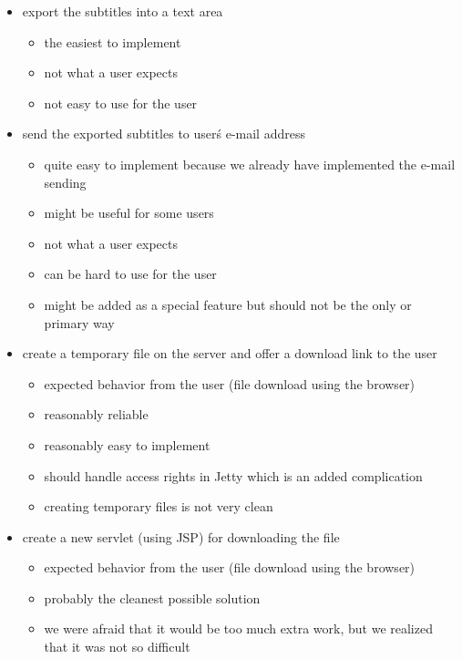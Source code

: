 {\begin{itemize}

\item export the subtitles into a text area
\begin{itemize}
\item the easiest to implement
\item not what a user expects
\item not easy to use for the user
\end{itemize}

\item send the exported subtitles to user\'s e-mail address
\begin{itemize}
\item quite easy to implement because we already have implemented the e-mail sending
\item might be useful for some users
\item not what a user expects
\item can be hard to use for the user
\item might be added as a special feature but should not be the only or primary way
\end{itemize}

\item create a temporary file on the server and offer a download link to the user
\begin{itemize}
\item expected behavior from the user (file download using the browser)
\item reasonably reliable
\item reasonably easy to implement
\item should handle access rights in Jetty which is an added complication
\item creating temporary files is not very clean
\end{itemize}

\item create a new servlet (using JSP) for downloading the file
\begin{itemize}
\item expected behavior from the user (file download using the browser)
\item probably the cleanest possible solution
\item we were afraid that it would be too much extra work, but we realized that it was not so difficult
\end{itemize}

\end{itemize}

}
